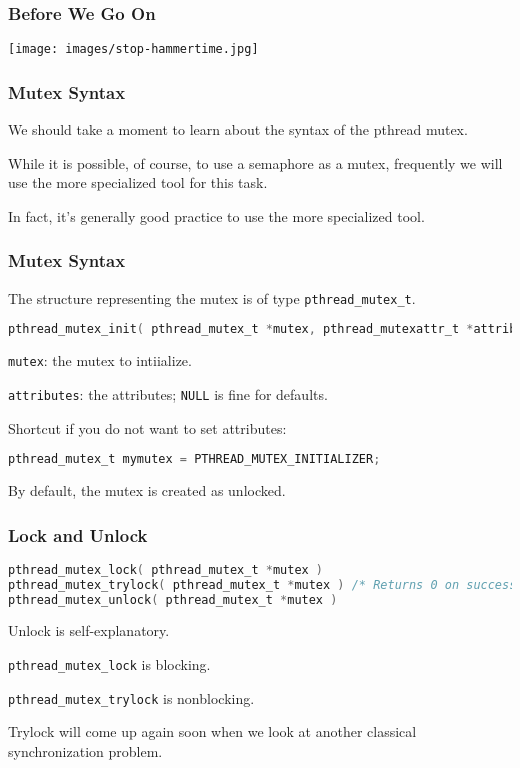 \begin{frame}
	\frametitle{Before We Go On}

	\begin{center}
		\texttt{[image: images/stop-hammertime.jpg]}
	\end{center}

\end{frame}


\begin{frame}
	\frametitle{Mutex Syntax}

	We should take a moment to learn about the syntax of the pthread mutex.

	While it is possible, of course, to use a semaphore as a mutex, frequently we will use the more specialized tool for this task.

	In fact, it's generally good practice to use the more specialized tool.

\end{frame}

\begin{frame}[fragile]
	\frametitle{Mutex Syntax}

	The structure representing the mutex is of type \texttt{pthread\_mutex\_t}.

	\begin{lstlisting}[language=C]
pthread_mutex_init( pthread_mutex_t *mutex, pthread_mutexattr_t *attributes )
\end{lstlisting}

	\texttt{mutex}: the mutex to intiialize.

	\texttt{attributes}: the attributes; \texttt{NULL} is fine for defaults.

	Shortcut if you do not want to set attributes:

	\begin{lstlisting}[language=C]
pthread_mutex_t mymutex = PTHREAD_MUTEX_INITIALIZER;
\end{lstlisting}

	By default, the mutex is created as unlocked.

\end{frame}

\begin{frame}[fragile]
	\frametitle{Lock and Unlock}

	\begin{lstlisting}[language=C]
pthread_mutex_lock( pthread_mutex_t *mutex )
pthread_mutex_trylock( pthread_mutex_t *mutex ) /* Returns 0 on success */
pthread_mutex_unlock( pthread_mutex_t *mutex )
\end{lstlisting}

	Unlock is self-explanatory.

	\texttt{pthread\_mutex\_lock} is blocking.

	\texttt{pthread\_mutex\_trylock} is nonblocking.

	Trylock will come up again soon when we look at another classical synchronization problem.

\end{frame}

